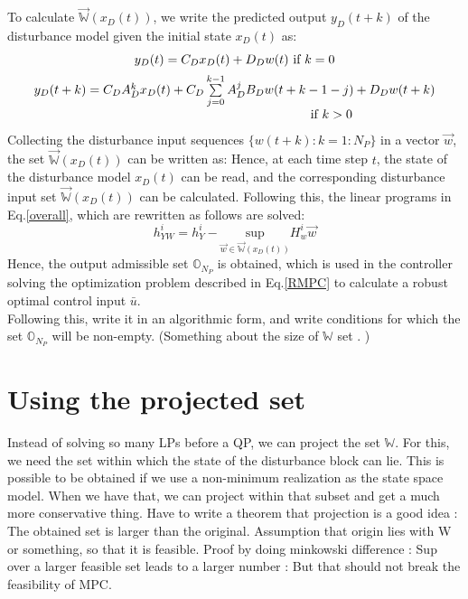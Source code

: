\documentclass[letterpaper, 10 pt, conference]{ieeeconf}  %
\begin{document}
	To calculate $\vec{\mathbb{W}}(x_D(t))$, we write the predicted output $y_D(t+k)$ of the disturbance model given the initial state $x_D(t)$ as:
	\begin{equation}
	\small
	\begin{matrix}
	y_D(t)=C_Dx_D(t)+D_Dw(t) \text{ if } k=0 \vspace{5pt} \\
	y_D(t+k)=C_DA_D^{k}x_D(t)+ C_D\sum\limits_{j=0}^{k-1}A_D^jB_Dw(t+k-1-j)+D_Dw(t+k) \\ \hspace{150pt}\text{ if } k>0
	\end{matrix}
	\end{equation}
    Collecting the disturbance input sequences  $\{w(t+k):k=1:N_P\}$ in a vector $\vec{w}$, the set $\vec{\mathbb{W}}(x_D(t))$ can be written as:     
    Hence, at each time step $t$, the state of the disturbance model $x_D(t)$ can be read, and the corresponding disturbance input set $\vec{\mathbb{W}}(x_D(t))$ can be calculated. Following this, the linear programs in  Eq.\eqref{overall}, which are rewritten as follows are solved:
    \begin{equation}
    h_{YW}^i = h_Y^i-\underset{\vec{w}\in \vec{\mathbb{W}}(x_D(t))}{\text{sup}} H_w^i \vec{w}  
    \end{equation}     
    Hence, the output admissible set $\mathbb{O}_{N_P}$ is obtained, which is used in the controller solving the optimization problem described in Eq.\eqref{RMPC} to calculate a robust optimal control input $\bar{u}$.
    \\
    {\color{blue} Following this, write it in an algorithmic form, and write conditions for which the set $\mathbb{O}_{N_P}$ will be non-empty. (Something about the size of $\mathbb{W}$ set . )
}
\section{Using the projected set}
Instead of solving so many LPs before a QP, we can project the set $\mathbb{W}$. For this, we need the set within which the state of the disturbance block can lie. This is possible to be obtained if we use a non-minimum realization as the state space model. When we have that, we can project within that subset and get a much more conservative thing. 
Have to write a theorem that projection is a good idea : The obtained set is larger than the original. Assumption that origin lies with W or something, so that it is feasible. Proof by doing minkowski difference : Sup over a larger feasible set leads to a larger number : But that should not break the feasibility of MPC.
    

\end{document}
